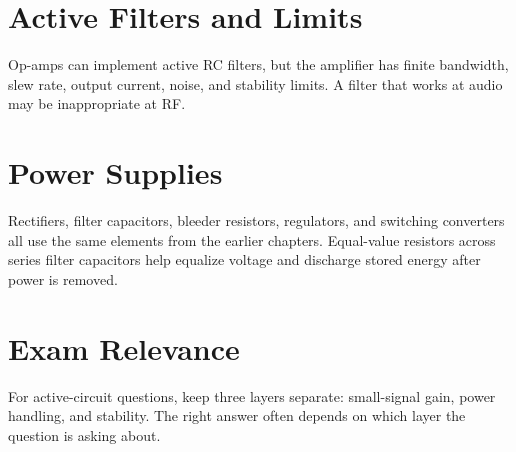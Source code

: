 \section{Active Filters and Limits}
Op-amps can implement active RC filters, but the amplifier has finite bandwidth,
slew rate, output current, noise, and stability limits. A filter that works at
audio may be inappropriate at RF.

\section{Power Supplies}
Rectifiers, filter capacitors, bleeder resistors, regulators, and switching
converters all use the same elements from the earlier chapters. Equal-value
resistors across series filter capacitors help equalize voltage and discharge
stored energy after power is removed.

\section{Exam Relevance}
\begin{exambox}
For active-circuit questions, keep three layers separate: small-signal gain,
power handling, and stability. The right answer often depends on which layer the
question is asking about.
\end{exambox}
